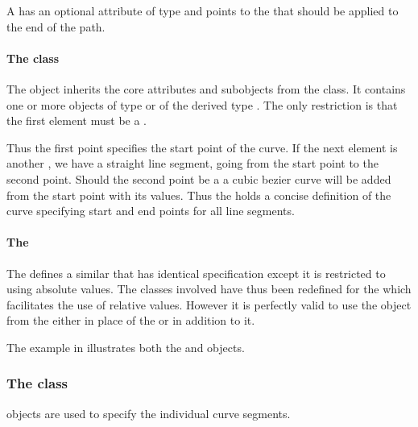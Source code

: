 A \RenderCurve has an optional attribute  of type
 and points to the \LineEnding that should be applied to the end of the path.

\paragraph{The  class}
\label{listofelements-class}

The \ListOfElements object inherits
the core attributes and subobjects from the  class. It
contains one or more objects of type \RenderPoint or of the derived type \RenderCubicBezier. 
The only restriction is that the first element must be a \RenderPoint.

Thus the first point specifies the start point of the curve. If the next element 
is another \RenderPoint, we have a straight line segment, going from the start point 
to the second point. Should the second point be a \RenderCubicBezier a cubic bezier curve 
will be added from the start point with its values. Thus the \ListOfElements holds a concise
definition of the curve specifying start and end points for all line segments. 

\paragraph{The }

The \LayoutPackage defines a similar  that has identical specification except it is restricted to using absolute values.  The classes involved have thus been redefined for the \RenderPackage which facilitates the use of relative values. However it is perfectly valid to use the  object from the \LayoutPackage either in place of the \ListOfElements or in addition to it. 

The example in  illustrates both the \ListOfElements and  objects.

\subsubsection{The  class}
\label{renderpoint-class}

\RenderPoint objects are used to 
specify the individual curve segments.

